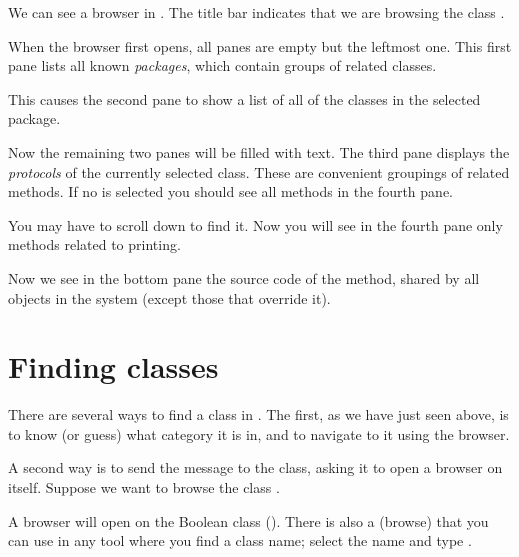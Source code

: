 \documentclass[a4paper,10pt,twoside]{book}
\begin{document}
We can see a browser in .
The title bar indicates that we are browsing the class .

When the browser first opens, all panes are empty but the leftmost one.
This first pane lists all known \emph{packages}, which contain groups of related classes.

This causes the second pane to show a list of all of the classes in the selected package.

Now the remaining two panes will be filled with text.
The third pane displays the \emph{protocols} of the currently selected class.
These are convenient groupings of related methods.
If no  is selected you should see all methods in the fourth pane.

You may have to scroll down to find it.
Now you will see in the fourth pane only methods related to printing.

Now we see in the bottom pane the source code of the  method, shared by all objects in the system (except those that override it).

\section{Finding classes}

There are several ways to find a class in \pharo.  The first, as we have just seen above, is to know (or guess) what category it is in, and to navigate to it using the browser.

A second way is to send the  message to the class, asking it to open a browser on itself.  Suppose we want to browse the class .

A browser will open on the Boolean class ().
There is also a   (browse) that you can use in any tool where you find a class name;
select the name and type .
\end{document}
